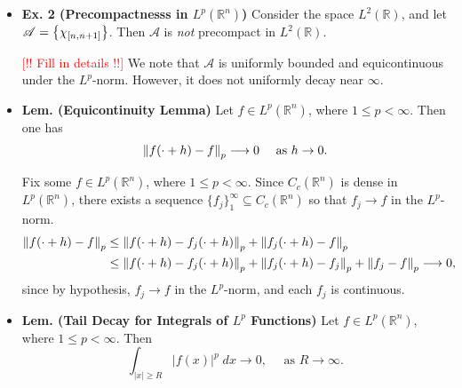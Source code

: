 \documentclass{article}
\begin{document}
\begin{itemize}
	\begin{solutions}
		\textcolor{red}{[!! Fill in details !!]} The sequence $\{f_{n}\}$ does \textit{not} have a convergent subsequence in $L^{2}$. However, it is uniformly bounded and uniformly decays near $\infty$. 
	\end{solutions}
	
	\item \textbf{Ex. 2 (Precompactnesss in $L^{p}(\mathbb{R}^{n})$)} Consider the space $L^{2}(\mathbb{R})$, and let $\mathscr{A} = \brac*{\chi_{[n,n+1]}}$. Then $\mathscr{A}$ is \textit{not} precompact in $L^{2}(\mathbb{R})$. 
	
	\begin{solutions}
		\textcolor{red}{[!! Fill in details !!]} We note that $\mathscr{A}$ is uniformly bounded and equicontinuous under the $L^{p}$-norm. However, it does not uniformly decay near $\infty$. 
	\end{solutions}
	
	\item \textbf{Lem. (Equicontinuity Lemma)} Let $f \in L^{p}(\mathbb{R}^{n})$, where $1 \leq p < \infty$. Then one has 
	\begin{equation}
		\norm{f(\cdot + h) - f}_{p}\longrightarrow 0 \quad \text{ as $h \to 0$}.
	\end{equation}
	
	\begin{solutions}
		Fix some $f \in L^{p}(\mathbb{R}^{n})$, where $1 \leq p < \infty$. Since $C_{c}(\mathbb{R}^{n})$ is dense in $L^{p}(\mathbb{R}^{n})$, there exists a sequence $\{f_{j}\}_{1}^{\infty} \subseteq C_{c}(\mathbb{R}^{n})$ so that $f_{j} \to f$ in the $L^{p}$-norm. 
		\begin{align}
			\begin{split} 
				\norm{f(\cdot + h) - f}_{p} &\leq \norm{f(\cdot + h) - f_{j}(\cdot + h)}_{p} + \norm{f_{j}(\cdot + h) - f}_{p}	\\
				&\leq \norm{f(\cdot + h) - f_{j}(\cdot + h)}_{p} + \norm{f_{j}(\cdot + h) - f_{j}}_{p} + \norm{f_{j} - f}_{p} \longrightarrow 0, 
			\end{split} 
		\end{align}
		since by hypothesis, $f_{j} \to f$ in the $L^{p}$-norm, and each $f_{j}$ is continuous. 
	\end{solutions}
	
	\item \textbf{Lem. (Tail Decay for Integrals of $L^{p}$ Functions)} Let $f \in L^{p}(\mathbb{R}^{n})$, where $1 \leq p < \infty$. Then 
	\begin{equation}
		\int_{|x|\geq R} |f(x)|^{p}\;dx \longrightarrow 0, \quad \text{ as $R \to \infty$}.
	\end{equation}
	

\end{itemize}
\end{document}
